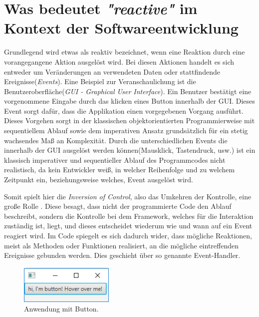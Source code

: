 \chapter{Was bedeutet \textit{"reactive"} im Kontext der Softwareentwicklung}\label{was_ist_reactive_programming}
Grundlegend wird etwas als reaktiv bezeichnet, wenn eine Reaktion durch eine vorangegangene Aktion ausgelöst wird. Bei diesen Aktionen handelt es sich entweder um Veränderungen an verwendeten Daten oder stattfindende Ereignisse(\textit{Events}). Eine Beispiel zur Veranschaulichung ist die Benutzeroberfläche(\textit{GUI - Graphical User Interface}). Ein Benutzer bestätigt eine vorgenommene Eingabe durch das klicken eines Button innerhalb der GUI. Dieses Event sorgt dafür, dass die Applikation einen vorgegebenen Vorgang ausführt. Dieses Vorgehen sorgt in der klassischen objektorientierten Programmierweise mit sequentiellem Ablauf sowie dem imperativen Ansatz grundsätzlich für ein stetig wachsendes Maß an Komplexität. Durch die unterschiedlichen Events die innerhalb der GUI ausgelöst werden können(Mausklick, Tastendruck, usw.) ist ein klassisch imperativer und sequentieller Ablauf des Programmcodes nicht realistisch, da kein Entwickler weiß, in welcher Reihenfolge und zu welchem Zeitpunkt ein, beziehungsweise welches, Event ausgelöst wird.

 Somit spielt hier die \textit{Inversion of Control}, also das Umkehren der Kontrolle, eine große Rolle \cite{MartinFowler.2005}. Diese besagt, dass nicht der programmierte Code den Ablauf beschreibt, sondern die Kontrolle bei dem Framework, welches für die Interaktion zuständig ist, liegt, und dieses entscheidet wiederum wie und wann auf ein Event reagiert wird. Im Code spiegelt es sich dadurch wider, dass mögliche Reaktionen, meist als Methoden oder Funktionen realisiert, an die mögliche eintreffenden Ereignisse gebunden werden. Dies geschieht über so genannte Event-Handler. \\
 \begin{figure}[hbt]
 	\centering
 	\includegraphics[width=0.4\textwidth]{Abb/buttonapp.PNG}
 	\caption{Anwendung mit Button.}
 	\label{pic:buttonapp}
 \end{figure}
